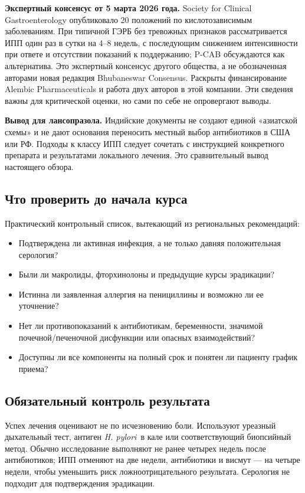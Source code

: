 \documentclass[11pt,a4paper,notitlepage]{report}
\newcommand{\Hp}{\textit{H. pylori}}
\newcommand{\src}[1]{\unskip\space\cite{#1}}
\begin{document}
\textbf{Экспертный консенсус от 5 марта 2026 года.} Society for Clinical Gastroenterology опубликовало 20 положений по кислотозависимым заболеваниям. При типичной ГЭРБ без тревожных признаков рассматривается ИПП один раз в сутки на 4--8 недель, с последующим снижением интенсивности при ответе и отсутствии показаний к поддержанию; P-CAB обсуждаются как альтернатива. Это экспертный консенсус другого общества, а не обозначенная авторами новая редакция Bhubaneswar Consensus. Раскрыты финансирование Alembic Pharmaceuticals и работа двух авторов в этой компании. Эти сведения важны для критической оценки, но сами по себе не опровергают выводы.\src{india2026}

\textbf{Вывод для лансопразола.} Индийские документы не создают единой «азиатской схемы» и не дают основания переносить местный выбор антибиотиков в США или РФ. Подходы к классу ИПП следует сочетать с инструкцией конкретного препарата и результатами локального лечения. Это сравнительный вывод настоящего обзора.\src{indiahp,india2026,acghp,rfpudmin}

\subsection{Что проверить до начала курса}
Практический контрольный список, вытекающий из региональных рекомендаций:\src{acghp,maastricht,khp}
\begin{itemize}
\item Подтверждена ли активная инфекция, а не только давняя положительная серология?
\item Были ли макролиды, фторхинолоны и предыдущие курсы эрадикации?
\item Истинна ли заявленная аллергия на пенициллины и возможно ли ее уточнение?
\item Нет ли противопоказаний к антибиотикам, беременности, значимой почечной/печеночной дисфункции или опасных взаимодействий?
\item Доступны ли все компоненты на полный срок и понятен ли пациенту график приема?
\end{itemize}

\subsection{Обязательный контроль результата}
Успех лечения оценивают не по исчезновению боли. Используют уреазный дыхательный тест, антиген \Hp\ в кале или соответствующий биопсийный метод. Обычно исследование выполняют не ранее четырех недель после антибиотиков; ИПП отменяют на две недели, антибиотики и висмут --- на четыре недели, чтобы уменьшить риск ложноотрицательного результата. Серология не подходит для подтверждения эрадикации.\src{acghighlights,maastricht}
\end{document}
